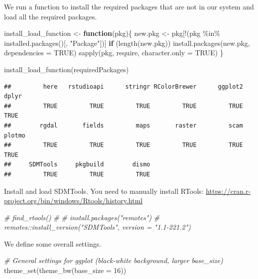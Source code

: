 \documentclass[
]{book}
\newenvironment{Shaded}{\begin{snugshade}}{\end{snugshade}}
\newcommand{\AttributeTok}[1]{\textcolor[rgb]{0.77,0.63,0.00}{#1}}
\newcommand{\CommentTok}[1]{\textcolor[rgb]{0.56,0.35,0.01}{\textit{#1}}}
\newcommand{\ConstantTok}[1]{\textcolor[rgb]{0.00,0.00,0.00}{#1}}
\newcommand{\ControlFlowTok}[1]{\textcolor[rgb]{0.13,0.29,0.53}{\textbf{#1}}}
\newcommand{\DecValTok}[1]{\textcolor[rgb]{0.00,0.00,0.81}{#1}}
\newcommand{\FunctionTok}[1]{\textcolor[rgb]{0.00,0.00,0.00}{#1}}
\newcommand{\NormalTok}[1]{#1}
\newcommand{\OtherTok}[1]{\textcolor[rgb]{0.56,0.35,0.01}{#1}}
\newcommand{\SpecialCharTok}[1]{\textcolor[rgb]{0.00,0.00,0.00}{#1}}
\newcommand{\StringTok}[1]{\textcolor[rgb]{0.31,0.60,0.02}{#1}}
\begin{document}
We run a function to install the required packages that are not in our system and load all the required packages.

\begin{Shaded}
\begin{Highlighting}[]
\NormalTok{install\_load\_function }\OtherTok{\textless{}{-}} \ControlFlowTok{function}\NormalTok{(pkg)\{}
\NormalTok{  new.pkg }\OtherTok{\textless{}{-}}\NormalTok{ pkg[}\SpecialCharTok{!}\NormalTok{(pkg }\SpecialCharTok{\%in\%} \FunctionTok{installed.packages}\NormalTok{()[, }\StringTok{"Package"}\NormalTok{])]}
  \ControlFlowTok{if}\NormalTok{ (}\FunctionTok{length}\NormalTok{(new.pkg))}
    \FunctionTok{install.packages}\NormalTok{(new.pkg, }\AttributeTok{dependencies =} \ConstantTok{TRUE}\NormalTok{)}
  \FunctionTok{sapply}\NormalTok{(pkg, require, }\AttributeTok{character.only =} \ConstantTok{TRUE}\NormalTok{)}
\NormalTok{\}}

\FunctionTok{install\_load\_function}\NormalTok{(requiredPackages)}
\end{Highlighting}
\end{Shaded}

\begin{verbatim}
##         here   rstudioapi      stringr RColorBrewer      ggplot2        dplyr 
##         TRUE         TRUE         TRUE         TRUE         TRUE         TRUE 
##        rgdal       fields         maps       raster         scam       plotmo 
##         TRUE         TRUE         TRUE         TRUE         TRUE         TRUE 
##     SDMTools     pkgbuild        dismo 
##         TRUE         TRUE         TRUE
\end{verbatim}

Install and load SDMTools. You need to manually install RTools: \url{https://cran.r-project.org/bin/windows/Rtools/history.html}

\begin{Shaded}
\begin{Highlighting}[]
\CommentTok{\# find\_rtools()}
\CommentTok{\# }
\CommentTok{\# install.packages("remotes")}
\CommentTok{\# remotes::install\_version("SDMTools", version = "1.1{-}221.2")}
\end{Highlighting}
\end{Shaded}

We define some overall settings.

\begin{Shaded}
\begin{Highlighting}[]
\CommentTok{\# General settings for ggplot (black{-}white background, larger base\_size)}
\FunctionTok{theme\_set}\NormalTok{(}\FunctionTok{theme\_bw}\NormalTok{(}\AttributeTok{base\_size =} \DecValTok{16}\NormalTok{))}
\end{Highlighting}
\end{Shaded}
\end{document}
